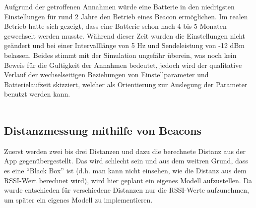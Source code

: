 Aufgrund der getroffenen Annahmen würde eine Batterie in den niedrigsten Einstellungen für rund 2 Jahre den Betrieb eines Beacon ermöglichen. Im realen Betrieb hatte sich gezeigt, dass eine Batterie schon nach 4 bis 5 Monaten gewechselt werden musste. Während dieser Zeit wurden die Einstellungen nicht geändert und bei einer Intervalllänge von 5 Hz und Sendeleistung von -12 dBm belassen. Beides stimmt mit der Simulation ungefähr überein, was noch kein Beweis für die Gultigkeit der Annahmen bedeutet, jedoch wird der qualitative Verlauf der wechselseitigen Beziehungen von Einstellparameter und Batterielaufzeit skizziert, welcher als Orientierung zur Auslegung der Parameter benutzt werden kann. \\ \\

\subsection{Distanzmessung mithilfe von Beacons}
Zuerst werden zwei bis drei Distanzen und dazu die berechnete Distanz aus der App gegenübergestellt. Das wird schlecht sein und aus dem weitren Grund, dass es eine "`Black Box"' ist (d.h. man kann nicht einsehen, wie die Distanz aus dem RSSI-Wert berechnet wird), wird hier geplant ein eigenes Modell aufzustellen. Da wurde entschieden für verschiedene Distanzen nur die RSSI-Werte aufzunehmen, um später ein eigenes Modell zu implementieren.
